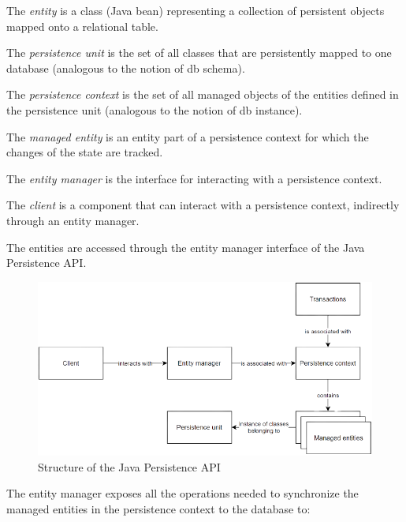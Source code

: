 \documentclass[12pt, a4paper]{report}
\begin{document}
        \begin{definition}
            The \emph{entity} is a class (Java bean) representing a collection of persistent objects mapped onto a relational table. 

            The \emph{persistence unit} is the set of all classes that are persistently mapped to one database (analogous to the notion of db schema). 

            The \emph{persistence context} is the set of all managed objects of the entities defined in the persistence unit (analogous to the notion of db instance). 

            The \emph{managed entity} is an entity part of a persistence context for which the changes of the state are tracked. 

            The \emph{entity manager} is the interface for interacting with a persistence context. 
            
            The \emph{client} is a component that can interact with a persistence context, indirectly through an entity manager.
        \end{definition}
        The entities are accessed through the entity manager interface of the Java Persistence API. 
        \begin{figure}[H]
            \centering
            \includegraphics[width=0.6\linewidth]{images/jpa.png}
            \caption{Structure of the Java Persistence API}
        \end{figure}
        The entity manager exposes all the operations needed to synchronize the managed entities in the persistence context to the database to:
\end{document}
